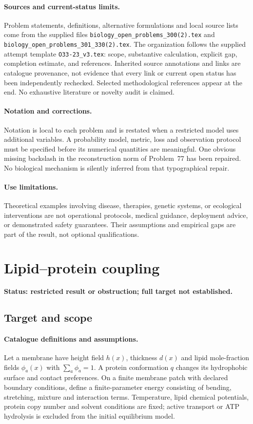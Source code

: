 \documentclass[11pt]{article}
\begin{document}
\paragraph{Sources and current-status limits.}
Problem statements, definitions, alternative formulations and local source lists
come from the supplied files
\texttt{biology\_open\_problems\_300(2).tex} and
\texttt{biology\_open\_problems\_301\_330(2).tex}.
The organization follows the supplied attempt template
\texttt{O33-23\_v3.tex}: scope, substantive calculation, explicit gap,
completion estimate, and references. Inherited source annotations and links are
catalogue provenance, not evidence that every link or current open status has
been independently rechecked. Selected methodological references appear at the
end. No exhaustive literature or novelty audit is claimed.

\paragraph{Notation and corrections.}
Notation is local to each problem and is restated when a restricted model uses
additional variables. A probability model, metric, loss and observation protocol
must be specified before its numerical quantities are meaningful. One obvious
missing backslash in the reconstruction norm of Problem~77 has been repaired.
No biological mechanism is silently inferred from that typographical repair.

\paragraph{Use limitations.}
Theoretical examples involving disease, therapies, genetic systems, or ecological
interventions are not operational protocols, medical guidance, deployment advice,
or demonstrated safety guarantees. Their assumptions and empirical gaps are part
of the result, not optional qualifications.


\section*{Lipid–protein coupling}
\label{prob:085}
\noindent\textbf{Status: restricted result or obstruction; full target not established.}
\subsection{Target and scope}
\paragraph{Catalogue definitions and assumptions.}
Let a membrane have height field $h(x)$, thickness $d(x)$ and lipid mole-fraction fields $\phi_a(x)$ with $\sum_a\phi_a=1$. A protein conformation $q$ changes its hydrophobic surface and contact preferences. On a finite membrane patch with declared boundary conditions, define a finite-parameter energy consisting of bending, stretching, mixture and interaction terms. Temperature, lipid chemical potentials, protein copy number and solvent conditions are fixed; active transport or ATP hydrolysis is excluded from the initial equilibrium model.
\end{document}
